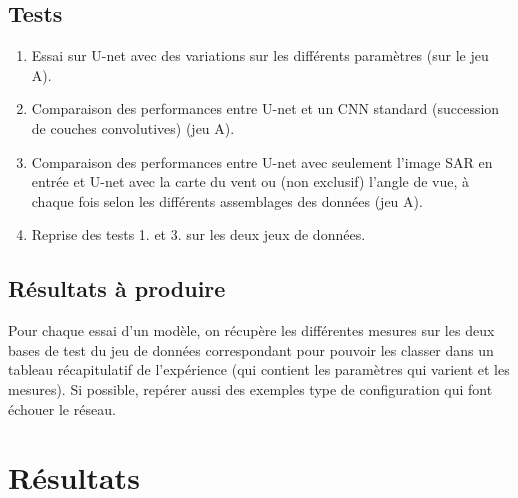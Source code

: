 \documentclass{article}
\begin{document}
\subsection{Tests}

\begin{enumerate}
\item Essai sur U-net avec des variations sur les différents paramètres (sur le jeu A).
\item Comparaison des performances entre U-net et un CNN standard (succession de couches convolutives) (jeu A).
\item Comparaison des performances entre U-net avec seulement l'image SAR en entrée et U-net avec la carte du vent ou (non exclusif) l'angle de vue, à chaque fois selon les différents assemblages des données (jeu A).
\item Reprise des tests 1. et 3. sur les deux jeux de données.
\end{enumerate}

\subsection{Résultats à produire}
Pour chaque essai d'un modèle, on récupère les différentes mesures sur les deux bases de test du jeu de données correspondant pour pouvoir les classer dans un tableau récapitulatif de l'expérience (qui contient les paramètres qui varient et les mesures).
Si possible, repérer aussi des exemples type de configuration qui font échouer le réseau.

\section{Résultats}

\begin{tabular}{}
  
\end{tabular}
\end{document}
